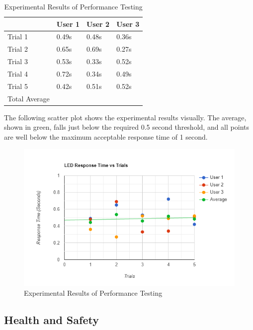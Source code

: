 \documentclass[12pt, titlepage]{article}
\begin{document}
\begin{table}[H]
    \centering
    \setlength{\leftmargini}{0cm}
    \begin{tabular}{| >{\centering\arraybackslash}m{4cm} | 
        >{\centering\arraybackslash}m{3cm} |
        >{\centering\arraybackslash}m{3cm} | 
        >{\centering\arraybackslash}m{3cm} |}
    \hline
    \rowcolor[gray]{0.9}
    & User 1 & User 2 & User 3 \\
    \hline
    Trial 1 & 0.49s & 0.48s & 0.36s \\
    \hline
    Trial 2 & 0.65s & 0.69s & 0.27s \\
    \hline
    Trial 3 & 0.53s & 0.33s & 0.52s \\
    \hline
    Trial 4 & 0.72s & 0.34s & 0.49s \\
    \hline
    Trial 5 & 0.42s & 0.51s & 0.52s \\
    \hline
    Total Average & \multicolumn{3}{c|}{\textbf{0.488s}}\\
    \hline
    \end{tabular}
\caption{Experimental Results of Performance Testing}
\end{table}

The following scatter plot shows the experimental results visually. The average, shown in green, falls just below the 
required 0.5 second threshold, and all points are well below the maximum acceptable response time of 1 second.

\begin{figure}[H]
    \includegraphics[scale=0.93]{performanceScatterPlot}
    \caption{Experimental Results of Performance Testing}
\end{figure}

\newpage
\subsection{Health and Safety}
\end{document}

